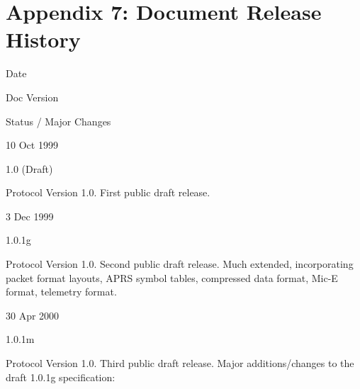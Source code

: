 \chapter{Appendix 7: Document Release History}


Date

Doc
Version

Status / Major Changes

10 Oct 1999

1.0 (Draft)

Protocol Version 1.0. First public draft release.

3 Dec 1999

1.0.1g

Protocol Version 1.0. Second public draft release. Much extended, incorporating packet format
layouts, APRS symbol tables, compressed data format, Mic-E format, telemetry format.

30 Apr 2000

1.0.1m

Protocol Version 1.0. Third public draft release.
Major additions/changes to the draft 1.0.1g specification:

